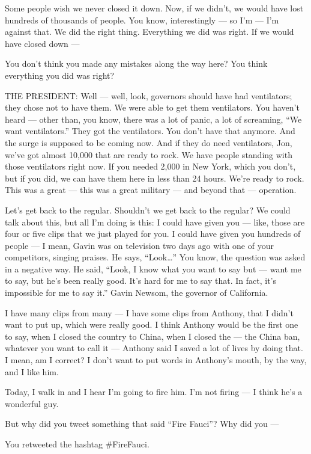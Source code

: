 Some people wish we never closed it down. Now, if we didn't, we would
have lost hundreds of thousands of people. You know, interestingly ---
so I'm --- I'm against that. We did the right thing. Everything we did
was right. If we would have closed down ---

You don't think you made any mistakes along the way here? You think
everything you did was right?

THE PRESIDENT: Well --- well, look, governors should have had
ventilators; they chose not to have them. We were able to get them
ventilators. You haven't heard --- other than, you know, there was a lot
of panic, a lot of screaming, ``We want ventilators.'' They got the
ventilators. You don't have that anymore. And the surge is supposed to
be coming now. And if they do need ventilators, Jon, we've got almost
10,000 that are ready to rock. We have people standing with those
ventilators right now. If you needed 2,000 in New York, which you don't,
but if you did, we can have them here in less than 24 hours. We're ready
to rock. This was a great --- this was a great military --- and beyond
that --- operation.

Let's get back to the regular. Shouldn't we get back to the regular? We
could talk about this, but all I'm doing is this: I could have given you
--- like, those are four or five clips that we just played for you. I
could have given you hundreds of people --- I mean, Gavin was on
television two days ago with one of your competitors, singing praises.
He says, ``Look\ldots{}'' You know, the question was asked in a negative
way. He said, ``Look, I know what you want to say but --- want me to
say, but he's been really good. It's hard for me to say that. In fact,
it's impossible for me to say it.'' Gavin Newsom, the governor of
California.

I have many clips from many --- I have some clips from Anthony, that I
didn't want to put up, which were really good. I think Anthony would be
the first one to say, when I closed the country to China, when I closed
the --- the China ban, whatever you want to call it --- Anthony said I
saved a lot of lives by doing that. I mean, am I correct? I don't want
to put words in Anthony's mouth, by the way, and I like him.

Today, I walk in and I hear I'm going to fire him. I'm not firing --- I
think he's a wonderful guy.

But why did you tweet something that said ``Fire Fauci''? Why did you
---

You retweeted the hashtag \#FireFauci.


